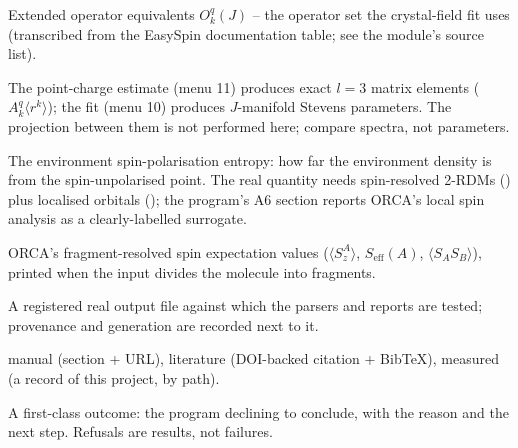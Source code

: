\begin{description}[leftmargin=0em, style=nextline]
  \item[Stevens operators] Extended operator equivalents $O_k^q(J)$ -- the
    operator set the crystal-field fit uses (transcribed from the EasySpin
    documentation table; see the module's source list).
  \item[l-shell vs $J$-manifold parameters] The point-charge estimate
    (menu 11) produces exact $l = 3$ matrix elements ($A_k^q \langle
    r^k\rangle$); the fit (menu 10) produces $J$-manifold Stevens parameters.
    The projection between them is not performed here; compare spectra, not
    parameters.
  \item[$\Delta S_E$] The environment spin-polarisation entropy: how far the
    environment density is from the spin-unpolarised point. The real quantity
    needs spin-resolved 2-RDMs () plus localised orbitals
    (); the program's A6 section reports ORCA's local spin
    analysis as a clearly-labelled surrogate.
  \item[local spin analysis] ORCA's fragment-resolved spin expectation values
    ($\langle S_z^A\rangle$, $S_{\mathrm{eff}}(A)$, $\langle S_A S_B\rangle$),
    printed when the input divides the molecule into fragments.
  \item[fixture] A registered real output file against which the parsers and
    reports are tested; provenance and generation are recorded next to it.
  \item[provenance classes] manual (section + URL), literature (DOI-backed
    citation + BibTeX), measured (a record of this project, by path).
  \item[refusal] A first-class outcome: the program declining to conclude, with
    the reason and the next step. Refusals are results, not failures.
\end{description}
